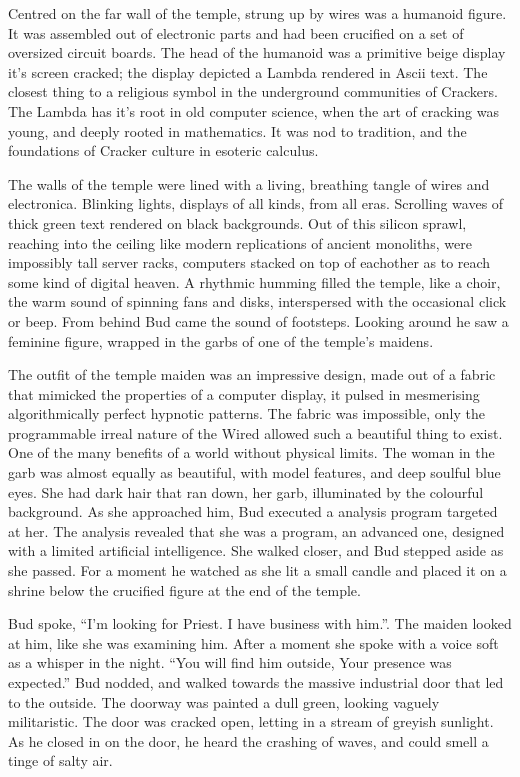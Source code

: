 \documentclass{book}
\begin{document}
Centred on the far wall of the temple, strung up by wires was a humanoid figure. It was assembled out of electronic parts and had been crucified on a set of oversized circuit boards. The head of the humanoid was a primitive beige display it's screen cracked; the display depicted a Lambda rendered in Ascii text. The closest thing to a religious symbol in the underground communities of Crackers. The Lambda has it's root in old computer science, when the art of cracking was young, and deeply rooted in mathematics. It was nod to tradition, and the foundations of Cracker culture in esoteric calculus.

The walls of the temple were lined with a living, breathing tangle of wires and electronica. Blinking lights, displays of all kinds, from all eras. Scrolling waves of thick green text rendered on black backgrounds. Out of this silicon sprawl, reaching into the ceiling like modern replications of ancient monoliths, were impossibly tall server racks, computers stacked on top of eachother as to reach some kind of digital heaven. A rhythmic humming filled the temple, like a choir, the warm sound of spinning fans and disks, interspersed with the occasional click or beep. From behind Bud came the sound of footsteps. Looking around he saw a feminine figure, wrapped in the garbs of one of the temple's maidens.

The outfit of the temple maiden was an impressive design, made out of a fabric that mimicked the properties of a computer display, it pulsed in mesmerising algorithmically perfect hypnotic patterns. The fabric was impossible, only the programmable irreal nature of the Wired allowed such a beautiful thing to exist. One of the many benefits of a world without physical limits. The woman in the garb was almost equally as beautiful, with model features, and deep soulful blue eyes. She had dark hair that ran down, her garb, illuminated by the colourful background. As she approached him, Bud executed a analysis program targeted at her. The analysis revealed that she was a program, an advanced one, designed with a limited artificial intelligence. She walked closer, and Bud stepped aside as she passed. For a moment he watched as she lit a small candle and placed it on a shrine below the crucified figure at the end of the temple.

Bud spoke, ``I'm looking for Priest. I have business with him.''. The maiden looked at him, like she was examining him. After a moment she spoke with a voice soft as a whisper in the night. ``You will find him outside, Your presence was expected.'' Bud nodded, and walked towards the massive industrial door that led to the outside. The doorway was painted a dull green, looking vaguely militaristic. The door was cracked open, letting in a stream of greyish sunlight. As he closed in on the door, he heard the crashing of waves, and could smell a tinge of salty air.
\end{document}
